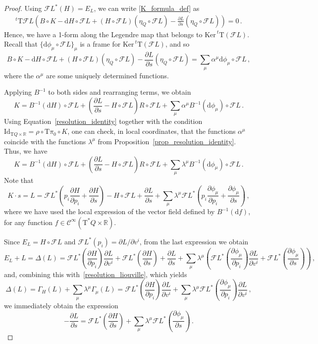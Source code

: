 \documentclass[11pt]{article}
\theoremstyle{plain}
\theoremstyle{definition}
\newcommand{\R}{\mathbb{R}}
\renewcommand{\d}{\mathrm{d}}
\newcommand{\Cinfty}{\mathscr{C}^\infty}
\newcommand{\T}{{\mathrm T}}
\let\Tan\T
\newcommand{\Id}{\mathrm{Id}}
\newcommand{\parder}[2]{\frac{\partial #1}{\partial #2}}
\newcommand{\tparder}[2]{\partial #1/\partial #2}
\def\d{\mathrm{d}}
\newcommand{\fracp}[2]{\frac{\partial #1}{\partial #2}}
\def\d{\mathrm{d}}
\def\Ker{\mathrm{Ker \,}}
\def\Tan{\mathrm{T}}
\def\FL{\mathcal{F} L}
\begin{document}
\begin{proof}
    Using $\FL^* (H) = E_L$, we can write \eqref{K_formula_def} as
\begin{align}
        ^t \T \FL\left(B\circ K -\d H \circ \FL + (H \circ\FL) (\eta_Q\circ \FL)- \parder{L}{s}(\eta_Q\circ \FL)\right) = 0\,.
\end{align}
Hence, we have a 1-form along the Legendre map that belongs to $\Ker ^t\Tan(\FL)$. Recall that $\{\d \phi_{\mu}\circ \FL\}_\mu$ is a frame for $\Ker ^t\Tan(\FL)$, and so
$$B\circ K -\d H \circ \FL + (H \circ\FL) (\eta_Q\circ \FL)- \parder{L}{s}(\eta_Q\circ \FL)=\sum_{\mu} \alpha^{\mu} \d\phi_{\mu}\circ\FL\,,$$
where the $\alpha^{\mu}$ are some uniquely  determined functions. 

Applying $B^{-1}$ to both sides and rearranging terms, we obtain
$$K= B^{-1}(\d H) \circ \FL + \left( \parder{L}{s}  -H \circ\FL\right)R\circ \FL + \sum_{\mu}\alpha^{\mu} B^{-1}(\d\phi_{\mu})\circ\FL\,.$$
Using Equation~\eqref{resolution_identity} together with the condition 
$\Id_{\Tan Q \times \R} = \rho\circ \Tan\pi_0 \circ K$, one can check, in local coordinates, that the functions $\alpha^{\mu}$ coincide with the functions $\lambda^{\mu}$ from Proposition~\ref{prop_resolution_identity}.
Thus, we have
\begin{equation}\label{K_formula_intermidiate}
    K= B^{-1}(\d H) \circ \FL + \left( \parder{L}{s}  -H \circ\FL\right)R\circ \FL + \sum_{\mu}\lambda^{\mu} B^{-1}(\d\phi_{\mu})\circ\FL\,.
\end{equation}
Note that
\begin{equation}
    K\cdot s =L = \FL^*\left(p_i\parder{H}{p_i}+\parder{H}{s}\right) - H\circ \FL +\parder{L}{s} +\sum_{\mu} \lambda^{\mu} \FL^*\left(p_i\parder{\phi_\mu}{p_i}+\parder{\phi_{\mu}}{s}\right)\,,
\end{equation}
where we have used the local expression of the vector field defined by $\displaystyle B^{-1}(\d f)$, for any function $f\in \Cinfty (\Tan^*Q \times \R)$.

Since $E_L = H\circ \FL$ and $\FL^*(p_i)=\tparder{L}{v^i}$, from the last expression we obtain
\begin{equation}
    E_L+L=\Delta(L) = \FL^*\left(\parder{H}{p_i}\right)\fracp{L}{v^i}+\FL^*\left(\parder{H}{s}\right) +\parder{L}{s} +\sum_{\mu} \lambda^{\mu} \left(\FL^*\left(\parder{\phi_\mu}{p_i}\right)\fracp{L}{v^i}+\FL^*\left(\parder{\phi_{\mu}}{s}\right)\right)\,,
\end{equation}
and, combining this with~\eqref{resolution_liouville}, which yields
\begin{equation}
    \Delta(L) = \Gamma_H(L) +\sum_{\mu}\lambda^{\mu} \Gamma_{\mu}(L) = \FL^*\left(\parder{H}{p_i}\right)\parder{L}{v^i}+\sum_{\mu}\lambda^{\mu}\FL^*\left(\parder{\phi_{\mu}}{p_i}\right)\parder{L}{v^i}\,,
\end{equation}
we immediately obtain the expression
\begin{equation}\label{L_partial_s_formula}
    -\parder{L}{s} = \FL^*\left(\parder{H}{s}\right) + \sum_{\mu}\lambda^{\mu}\FL^*\left( \parder{\phi_{\mu}}{s} \right)\,.
\end{equation}




\end{proof}
\end{document}
